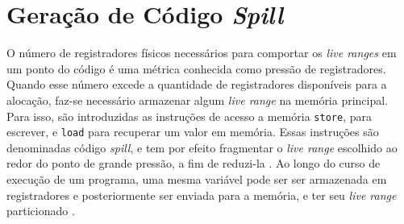 \documentclass[
	12pt,				%
	openright,			%
	oneside,			%
	a4paper,			%
	tccpreliminar,			%
	]{ABNT-DC-UEL}
\begin{document}
\section{Geração de Código \textit{Spill}}

O número de registradores físicos necessários para comportar os \textit{live ranges} em um ponto do código é uma métrica conhecida como pressão de registradores. Quando esse número excede a quantidade de registradores disponíveis para a alocação, faz-se necessário armazenar algum \textit{live range} na memória principal. Para isso, são introduzidas as instruções de acesso a memória \texttt{store}, para escrever, e \texttt{load} para recuperar um valor em memória. Essas instruções são denominadas código \textit{spill}, e tem por efeito fragmentar o \textit{live range} escolhido ao redor do ponto de grande pressão, a fim de reduzi-la \cite{chaitin:81}. Ao longo do curso de execução de um programa, uma mesma variável pode ser ser armazenada em registradores e posteriormente ser enviada para a memória, e ter seu \textit{live range} particionado \cite{eisl:16}.
\end{document}
